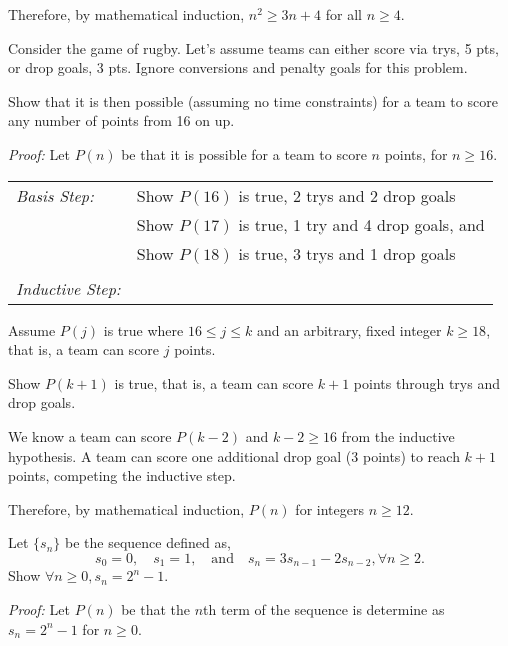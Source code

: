 \begin{questions}
\begin{solution}
  Therefore, by mathematical induction, $n^2 \geq 3n + 4$ for all $n \geq 4$.
\end{solution}



 Consider the game of rugby.  Let's assume teams can either score via trys, 5 pts, or drop goals, 3 pts.   Ignore conversions and penalty goals for this problem.  

Show that it is then possible (assuming no time constraints) for a team to score any number of points from 16 on up. 
    \ifprintanswers
        \vspace{-10pt}
   \fi
\begin{solution}
  \textit{Proof:}
  Let $P(n)$ be that it is possible for a team to score $n$ points, for $n \geq 16$.
  
  \smallskip
  \begin{tabular}{lp{4in}}
    \textit{Basis Step:}  & Show $P(16)$ is true, 2 trys and 2 drop goals \\
                & Show $P(17)$ is true, 1 try and 4 drop goals, and \\
                & Show $P(18)$ is true, 3 trys and 1 drop goals \\
     & \\
   \textit{Inductive Step:} &  \\
  \end{tabular}

  Assume $P(j)$ is true where $16 \leq j \leq k$ and an arbitrary, fixed integer $k \geq 18$, that is, a team can score $j$ points. 

  Show $P(k+1)$ is true, that is, a team can score $k+1$ points through trys and drop goals.

  We know a team can score $P(k-2)$ and $k -2 \geq 16$ from the inductive hypothesis. A team can score one additional drop goal (3 points) to reach $k+1$ points, competing the inductive step. 

  Therefore, by mathematical induction, $P(n)$ for integers $n \geq 12$. 
\end{solution}



\newpage
 Let $\{s_n\}$ be the sequence defined as, 
\[ s_0 = 0, \quad s_1 = 1,  \quad \text{and} \quad s_n = 3s_{n-1} - 2s_{n-2}, \forall n \geq 2. \]
Show $\forall n \geq 0, s_n = 2^n - 1 .$
    \ifprintanswers
        \vspace{-10pt}
   \fi
\begin{solution}
  \textit{Proof:}
  Let $P(n)$ be that the $n$th term of the sequence is determine as $s_n = 2^n - 1$ for $n \geq 0$.


\end{solution}
\end{questions}
